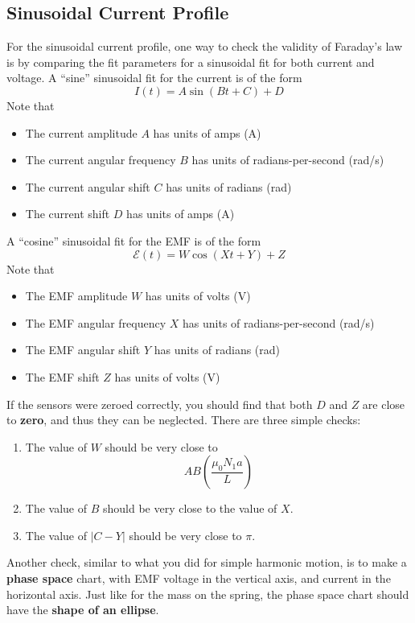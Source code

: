 \subsection{Sinusoidal Current Profile}
%
For the sinusoidal current profile, one way to check the validity of Faraday's law is by comparing the fit parameters for a sinusoidal fit for both current and voltage. A ``sine'' sinusoidal fit for the current is of the form
\begin{equation}
	I(t) = A \sin(B t + C) + D
\end{equation}
Note that
\begin{itemize}
	\item The current amplitude $A$ has units of amps (A)
	\item The current angular frequency $B$ has units of radians-per-second (rad/s)
	\item The current angular shift $C$ has units of radians (rad)
	\item The current shift $D$ has units of amps (A)
\end{itemize}
A ``cosine'' sinusoidal fit for the EMF is of the form
\begin{equation}
	\mathcal{E}(t) = W \cos(X t + Y) + Z
\end{equation}
Note that
\begin{itemize}
	\item The EMF amplitude $W$ has units of volts (V)
	\item The EMF angular frequency $X$ has units of radians-per-second (rad/s)
	\item The EMF angular shift $Y$ has units of radians (rad)
	\item The EMF shift $Z$ has units of volts (V)
\end{itemize}
If the sensors were zeroed correctly, you should find that both $D$ and $Z$ are close to \textbf{zero}, and thus they can be neglected. There are three simple checks:
\begin{enumerate}
	\item The value of $W$ should be very close to
	\begin{equation}
		A B \left(\frac{\mu_{0} N_{1} a}{L}\right)
	\end{equation}
	\item The value of $B$ should be very close to the value of $X$.
	\item The value of $\vert C - Y \vert$ should be very close to $\pi$.
\end{enumerate}
Another check, similar to what you did for simple harmonic motion, is to make a \textbf{phase space} chart, with EMF voltage in the vertical axis, and current in the horizontal axis. Just like for the mass on the spring, the phase space chart should have the \textbf{shape of an ellipse}.
%
